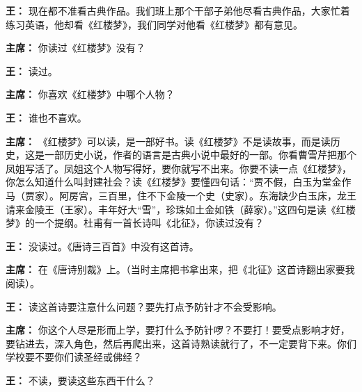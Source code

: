 \begin{list}{}{
    \setlength{\topsep}{0pt}        %
    \setlength{\partopsep}{0pt}     %
    \setlength{\parsep}{\parskip}   %
    \setlength{\itemsep}{\lineskip}       %
    \setlength{\labelsep}{0pt}%
    \setlength{\labelwidth}{3em}%
    \setlength{\itemindent}{0pt}%
    \setlength\listparindent{\parindent}
    \setlength{\leftmargin}{3em}
    \setlength{\rightmargin}{0pt}
    }


\item[\textbf{王：}] 现在都不准看古典作品。我们班上那个干部子弟他尽看古典作品，大家忙着练习英语，他却看《红楼梦》，我们同学对他看《红楼梦》都有意见。

\item[\textbf{主席：}] 你读过《红楼梦》没有？

\item[\textbf{王：}] 读过。

\item[\textbf{主席：}] 你喜欢《红楼梦》中哪个人物？

\item[\textbf{王：}] 谁也不喜欢。

\item[\textbf{主席：}] 《红楼梦》可以读，是一部好书。读《红楼梦》不是读故事，而是读历史，这是一部历史小说，作者的语言是古典小说中最好的一部。你看曹雪芹把那个凤姐写活了。凤姐这个人物写得好，要你就写不出来。你要不读一点《红楼梦》，你怎么知道什么叫封建社会？读《红楼梦》要懂四句话：“贾不假，白玉为堂金作马（贾家）。阿房宫，三百里，住不下金陵一个史（史家）。东海缺少白玉床，龙王请来金陵王（王家）。丰年好大“雪”，珍珠如土金如铁（薛家）。”这四句是读《红楼梦》的一个提纲。杜甫有一首长诗叫《北征》，你读过没有？

\item[\textbf{王：}] 没读过。《唐诗三百首》中没有这首诗。

\item[\textbf{主席：}] 在《唐诗别裁》上。（当时主席把书拿出来，把《北征》这首诗翻出家要我阅读）。

\item[\textbf{王：}] 读这首诗要注意什么问题？要先打点予防针才不会受影响。

\item[\textbf{主席：}] 你这个人尽是形而上学，要打什么予防针啰？不要打！要受点影响才好，要钻进去，深入角色，然后再爬出来，这首诗熟读就行了，不一定要背下来。你们学校要不要你们读圣经或佛经？

\item[\textbf{王：}] 不读，要读这些东西干什么？


\end{list}
